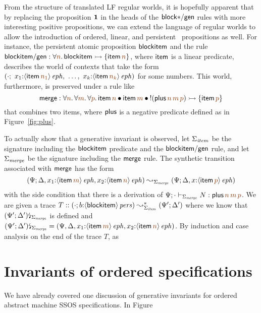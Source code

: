 From the structure of translated LF regular worlds, it is hopefully
apparent that by replacing the proposition $\mathbf{1}$ in the heads of the
${\sf block{*}/gen}$ rules with more interesting positive
\sls propositions,  we can extend the language of regular
worlds to allow the introduction of ordered, linear, and persistent
\sls~propositions as well. For instance, the persistent atomic proposition
${\sf blockitem}$ and the rule
${\sf blockitem/gen} : 
\forall \lf{n}. \, {\sf blockitem} \lefti \{ {\sf item}\,\lf{n} \}$,
where ${\sf item}$ is a linear predicate,
describes the world of contexts that take the form
$\left(\cdot; ~ x_1{:}\iseph{\susp{{\sf item}\,\lf{n_1}}}, ~
         \ldots, ~
         x_k{:}\iseph{\susp{{\sf item}\,\lf{n_k}}}\right)$
for some numbers. This world, furthermore, is preserved
under a rule like 
\[
  {\sf merge} : 
  \forall \lf{n}.\,\forall\lf{m}.\,\forall\lf{p}.\,
   {\sf item}\,\lf{n} \fuse
   {\sf item}\,\lf{m} \fuse
   {!}({\sf plus}\,\lf{n}\,\lf{m}\,\lf{p}) 
    \lefti \{ {\sf item}\,\lf{p} \}
\]
that combines two items, 
where ${\sf plus}$ is a negative predicate defined as in 
Figure~\ref{fig:plus}.  

To actually show that a generative invariant is observed, let
$\Sigma_{\it item}$ be the signature including the ${\sf blockitem}$
predicate and the ${\sf blockitem/gen}$ rule, and let $\Sigma_{\it
  merge}$ be the signature including the ${\sf merge}$ rule. 
The synthetic transition associated with ${\sf merge}$ 
has the form 
\[
(\Psi; \Delta, x_1{:}\iseph{\susp{{\sf item}\,\lf{m}}},
          x_2{:}\iseph{\susp{{\sf item}\,\lf{n}}}) 
\leadsto_{\Sigma_{\it merge}} 
 (\Psi; \Delta, x{:}\iseph{\susp{{\sf item}\,\lf{p}}})\]
with the side condition that there is a derivation
of $\Psi; \cdot \vdash_{\Sigma_{\it merge}} N : 
    {\sf plus}\,\lf{n}\,\lf{m}\,\lf{p}$. 
We are given a trace
$T :: (\cdot; b{:}{\langle {{\sf blockitem}} \rangle}\,{{\it pers}}) \leadsto^*_{\Sigma_{\it item}}
     (\Psi'; \Delta')$ where we know that
${(\Psi'; \Delta')}{\mbox{\lightning}}_{\Sigma_{\it merge}}$ is defined and
$\restrictsig{(\Psi'; \Delta')}{\Sigma_{\it merge}} = 
 (\Psi, \Delta, x_1{:}\iseph{\susp{{\sf item}\,\lf{m}}},
          x_2{:}\iseph{\susp{{\sf item}\,\lf{n}}})$. By induction
and case analysis on the end of the trace $T$, as 


\section{Invariants of ordered specifications}

We have already covered one discussion of generative invariants for 
ordered abstract machine SSOS specifications. In Figure 

